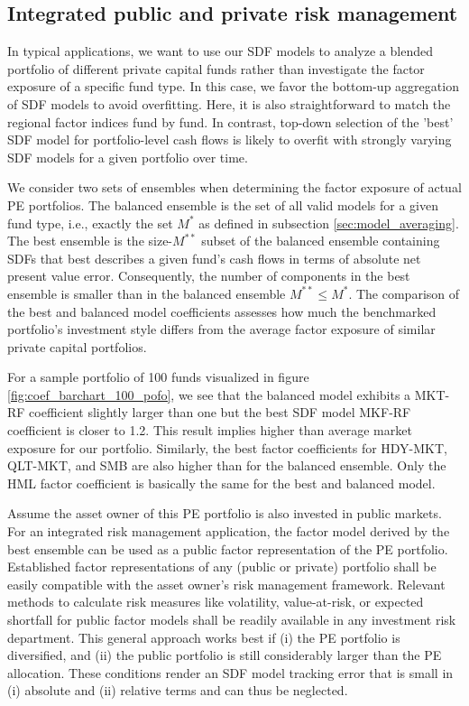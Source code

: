 \documentclass[12pt]{article}
\begin{document}
\subsection{Integrated public and private risk management}
\label{sec:integrated_risk}

In typical applications, we want to use our SDF models to analyze a blended portfolio of different private capital funds rather than investigate the factor exposure of a specific fund type.
In this case, we favor the bottom-up aggregation of SDF models to avoid overfitting.
Here, it is also straightforward to match the regional factor indices fund by fund.
In contrast, top-down selection of the 'best' SDF model for portfolio-level cash flows is likely to overfit with strongly varying SDF models for a given portfolio over time.

We consider two sets of ensembles when determining the factor exposure of actual PE portfolios.
The balanced ensemble is the set of all valid models for a given fund type, i.e., exactly the set $M^*$ as defined in subsection \ref{sec:model_averaging}.
The best ensemble is the size-$M^{**}$ subset of the balanced ensemble containing SDFs that best describes a given fund's cash flows in terms of absolute net present value error. 
Consequently, the number of components in the best ensemble is smaller than in the balanced ensemble $M^{**} \leq M^*$.
The comparison of the best and balanced model coefficients assesses how much the benchmarked portfolio's investment style differs from the average factor exposure of similar private capital portfolios.

For a sample portfolio of 100 funds visualized in figure \ref{fig:coef_barchart_100_pofo}, we see that the balanced model exhibits a MKT-RF coefficient slightly larger than one but the best SDF model MKF-RF coefficient is closer to 1.2.
This result implies higher than average market exposure for our portfolio.
Similarly, the best factor coefficients for HDY-MKT, QLT-MKT, and SMB are also higher than for the balanced ensemble.
Only the HML factor coefficient is basically the same for the best and balanced model.

Assume the asset owner of this PE portfolio is also invested in public markets.
For an integrated risk management application, the factor model derived by the best ensemble can be used as a public factor representation of the PE portfolio.
Established factor representations of any (public or private) portfolio shall be easily compatible with the asset owner's risk management framework.
Relevant methods to calculate risk measures like volatility, value-at-risk, or expected shortfall for public factor models shall be readily available in any investment risk department. 
This general approach works best if (i) the PE portfolio is diversified, and (ii) the public portfolio is still considerably larger than the PE allocation.
These conditions render an SDF model tracking error that is small in (i) absolute and (ii) relative terms and can thus be neglected.
\end{document}
